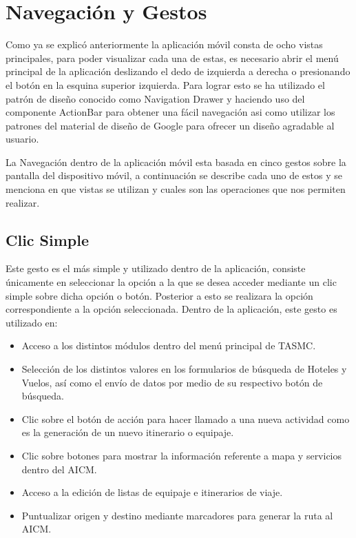 \section{Navegación y Gestos}
Como ya se explicó anteriormente la aplicación móvil consta de ocho vistas principales, para poder visualizar cada una de estas, 
es necesario abrir el menú principal de la aplicación deslizando el dedo de izquierda a derecha o presionando el botón en la 
esquina superior izquierda. Para lograr esto se ha utilizado el patrón de diseño conocido como Navigation Drawer y haciendo uso
del componente ActionBar para obtener una fácil navegación asi como utilizar los patrones del material de diseño de Google para 
ofrecer un diseño agradable al usuario.

La Navegación dentro de la aplicación móvil esta basada en cinco gestos sobre la pantalla del dispositivo móvil, a continuación 
se describe cada uno de estos y se menciona en que vistas se utilizan y cuales son las operaciones que nos permiten realizar.

\subsection{Clic Simple}
Este gesto es el más simple y utilizado dentro de la aplicación, consiste únicamente en seleccionar la opción a la que se desea 
acceder mediante un clic simple sobre dicha opción o botón. Posterior a esto se realizara la opción correspondiente a la opción 
seleccionada. Dentro de la aplicación, este gesto es utilizado en: 

\begin{itemize}
 \item Acceso a los distintos módulos dentro del menú principal de TASMC.
 \item Selección de los distintos valores en los formularios de búsqueda de Hoteles y Vuelos, así como el envío de datos por medio 
 de su respectivo botón de búsqueda.
 \item Clic sobre el botón de acción para hacer llamado a una nueva actividad como es la generación de un nuevo itinerario o equipaje.
 \item Clic sobre botones para mostrar la información referente a mapa y servicios dentro del AICM.
 \item Acceso a la edición de listas de equipaje e itinerarios de viaje.
 \item Puntualizar origen y destino mediante marcadores para generar la ruta al AICM.
\end{itemize}

